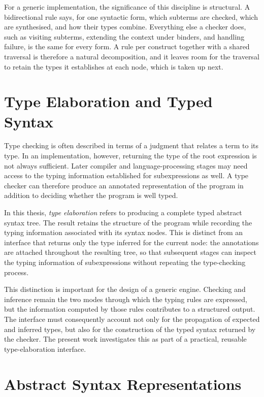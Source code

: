 For a generic implementation, the significance of this discipline is structural. A bidirectional rule says, for one syntactic form, which subterms are checked, which are synthesised, and how their types combine. Everything else a checker does, such as visiting subterms, extending the context under binders, and handling failure, is the same for every form. A rule per construct together with a shared traversal is therefore a natural decomposition, and it leaves room for the traversal to retain the types it establishes at each node, which is taken up next.

\section{Type Elaboration and Typed Syntax}
\label{sec:lr-elaboration}

Type checking is often described in terms of a judgment that relates a term to its type. In an implementation, however, returning the type of the root expression is not always sufficient. Later compiler and language-processing stages may need access to the typing information established for subexpressions as well. A type checker can therefore produce an annotated representation of the program in addition to deciding whether the program is well typed.

In this thesis, \emph{type elaboration} refers to producing a complete typed abstract syntax tree. The result retains the structure of the program while recording the typing information associated with its syntax nodes. This is distinct from an interface that returns only the type inferred for the current node: the annotations are attached throughout the resulting tree, so that subsequent stages can inspect the typing information of subexpressions without repeating the type-checking process.

This distinction is important for the design of a generic engine. Checking and inference remain the two modes through which the typing rules are expressed, but the information computed by those rules contributes to a structured output. The interface must consequently account not only for the propagation of expected and inferred types, but also for the construction of the typed syntax returned by the checker. The present work investigates this as part of a practical, reusable type-elaboration interface.

\section{Abstract Syntax Representations}
\label{sec:lr-syntax}

